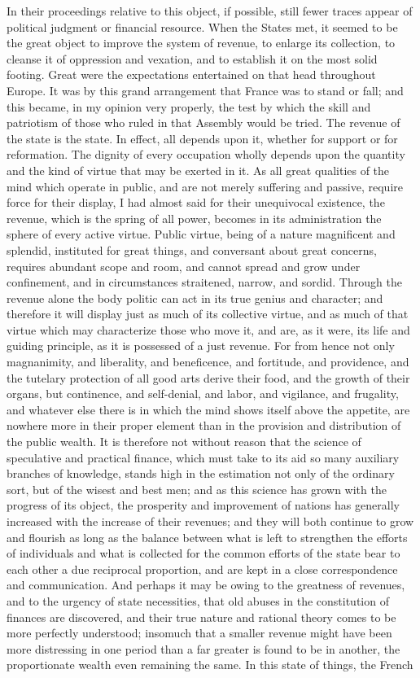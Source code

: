 In their proceedings relative to this object, if possible, still fewer traces appear of political judgment or financial resource. When the States met, it seemed to be the great object to improve the system of revenue, to enlarge its collection, to cleanse it of oppression and vexation, and to establish it on the most solid footing. Great were the expectations entertained on that head throughout Europe. It was by this grand arrangement that France was to stand or fall; and this became, in my opinion very properly, the test by which the skill and patriotism of those who ruled in that Assembly would be tried. The revenue of the state is the state. In effect, all depends upon it, whether for support or for reformation. The dignity of every occupation wholly depends upon the quantity and the kind of virtue that may be exerted in it. As all great qualities of the mind which operate in public, and are not merely suffering and passive, require force for their display, I had almost said for their unequivocal existence, the revenue, which is the spring of all power, becomes in its administration the sphere of every active virtue. Public virtue, being of a nature magnificent and splendid, instituted for great things, and conversant about great concerns, requires abundant scope and room, and cannot spread and grow under confinement, and in circumstances straitened, narrow, and sordid. Through the revenue alone the body politic can act in its true genius and character; and therefore it will display just as much of its collective virtue, and as much of that virtue which may characterize those who move it, and are, as it were, its life and guiding principle, as it is possessed of a just revenue. For from hence not only magnanimity, and liberality, and beneficence, and fortitude, and providence, and the tutelary protection of all good arts derive their food, and the growth of their organs, but continence, and self-denial, and labor, and vigilance, and frugality, and whatever else there is in which the mind shows itself above the appetite, are nowhere more in their proper element than in the provision and distribution of the public wealth. It is therefore not without reason that the science of speculative and practical finance, which must take to its aid so many auxiliary branches of knowledge, stands high in the estimation not only of the ordinary sort, but of the wisest and best men; and as this science has grown with the progress of its object, the prosperity and improvement of nations has generally increased with the increase of their revenues; and they will both continue to grow and flourish as long as the balance between what is left to strengthen the efforts of individuals and what is collected for the common efforts of the state bear to each other a due reciprocal proportion, and are kept in a close correspondence and communication. And perhaps it may be owing to the greatness of revenues, and to the urgency of state necessities, that old abuses in the constitution of finances are discovered, and their true nature and rational theory comes to be more perfectly understood; insomuch that a smaller revenue might have been more distressing in one period than a far greater is found to be in another, the proportionate wealth even remaining the same. In this state of things, the French 